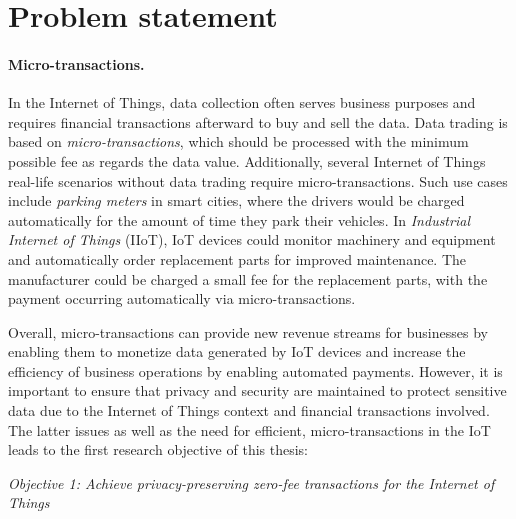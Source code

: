 \section{Problem statement}
\label{S_problem_statement}
\paragraph{Micro-transactions.} In the Internet of Things, data collection often serves business purposes and requires financial transactions afterward to buy and sell the data. Data trading is based on \emph{micro-transactions}, which should be processed with the minimum possible fee as regards the data value. Additionally, several Internet of Things real-life scenarios without data trading require micro-transactions. Such use cases include \emph{parking meters} in smart cities, where the drivers would be charged automatically for the amount of time they park their vehicles. In \emph{Industrial Internet of Things} (IIoT), IoT devices could monitor machinery and equipment and automatically order replacement parts for improved maintenance. The manufacturer could be charged a small fee for the replacement parts, with the payment occurring automatically via micro-transactions.

Overall, micro-transactions can provide new revenue streams for businesses by enabling them to monetize data generated by IoT devices and 
increase the efficiency of business operations by enabling automated payments.
However, it is important to ensure that privacy and security are maintained to protect sensitive data due to the Internet of Things context and financial transactions involved.
The latter issues as well as the need for efficient, micro-transactions in the IoT leads to the first research objective of this thesis:
\begin{mdframed}[ skipabove=20pt, skipbelow=20pt, innertopmargin=12pt, innerbottommargin=12pt] 
\begin{center}
     \emph{Objective 1: Achieve privacy-preserving zero-fee transactions for the Internet of Things} 
     \label{obj:1}
\end{center}
\end{mdframed}

